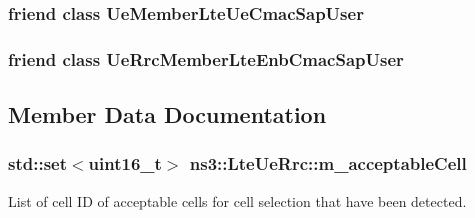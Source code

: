\subsubsection[{\texorpdfstring{Ue\+Member\+Lte\+Ue\+Cmac\+Sap\+User}{UeMemberLteUeCmacSapUser}}]{\setlength{\rightskip}{0pt plus 5cm}friend class {\bf Ue\+Member\+Lte\+Ue\+Cmac\+Sap\+User}\hspace{0.3cm}{\ttfamily [friend]}}\hypertarget{classns3_1_1LteUeRrc_a80362a3b9b0782a3a2140bf88b1af11f}{}\label{classns3_1_1LteUeRrc_a80362a3b9b0782a3a2140bf88b1af11f}
\subsubsection[{\texorpdfstring{Ue\+Rrc\+Member\+Lte\+Enb\+Cmac\+Sap\+User}{UeRrcMemberLteEnbCmacSapUser}}]{\setlength{\rightskip}{0pt plus 5cm}friend class Ue\+Rrc\+Member\+Lte\+Enb\+Cmac\+Sap\+User\hspace{0.3cm}{\ttfamily [friend]}}\hypertarget{classns3_1_1LteUeRrc_a6ab031be711bdc3f6c8e10a814bf7e0d}{}\label{classns3_1_1LteUeRrc_a6ab031be711bdc3f6c8e10a814bf7e0d}


\subsection{Member Data Documentation}
\subsubsection[{\texorpdfstring{m\+\_\+acceptable\+Cell}{m_acceptableCell}}]{\setlength{\rightskip}{0pt plus 5cm}std\+::set$<$uint16\+\_\+t$>$ ns3\+::\+Lte\+Ue\+Rrc\+::m\+\_\+acceptable\+Cell\hspace{0.3cm}{\ttfamily [private]}}\hypertarget{classns3_1_1LteUeRrc_ab2bbe11352c65c6dc52e9809726461ea}{}\label{classns3_1_1LteUeRrc_ab2bbe11352c65c6dc52e9809726461ea}


List of cell ID of acceptable cells for cell selection that have been detected. 

